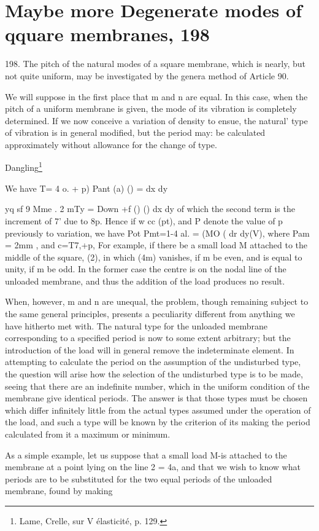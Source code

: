 \section{Maybe more Degenerate modes of qquare membranes, 198}

198. The pitch of the natural modes of a square membrane, which is
nearly, but not quite uniform, may be investigated by the genera method
of Article 90.

We will suppose in the first place that m and n are equal. In this case,
when the pitch of a uniform membrane is given, the mode of its vibration
is completely determined. If we now conceive a variation of density to
ensue, the natural' type of vibration is in general modified, but the
period may: be calculated approximately without allowance for the change
of type.

Dangling\footnote{ Lame, Crelle, sur V élasticité, p. 129.}

We have T= 4 o. + p) Pant (a) () = dx dy

yq sf 9 Mme . 2 mTy = Down +f () () dx dy of which the second term is
the increment of 7' due to 8p. Hence
if w cc (pt), and P denote the value of p previously to variation,
we have Pot Pmt=1-4 al. = (MO ( dr dy(V),
where Pam = 2mm , and c=T7,+p, For example, if there be a small load M
attached to the middle of the square,
(2),
in which (4m) vanishes, if m be even, and is equal to unity, if m be
odd. In the former case the centre is on the nodal line of the unloaded
membrane, and thus the addition of the load produces no result.

When, however, m and n are unequal, the problem, though remaining
subject to the same general principles, presents a peculiarity different
from anything we have hitherto met with. The natural type for the
unloaded membrane corresponding to a specified period is now to some
extent arbitrary; but the introduction of the load will in general
remove the indeterminate element. In attempting to calculate the period
on the assumption of the undisturbed type, the question will arise how
the selection of the undisturbed type is to be made, seeing that there
are an indefinite number, which in the uniform condition of the membrane
give identical periods. The answer is that those types must be chosen
which differ infinitely little from the actual types assumed under the
operation of the load, and such a type will be known by the criterion of
its making the period calculated from it a maximum or minimum.

As a simple example, let us suppose that a small load M-is attached to
the membrane at a point lying on the line 2 = 4a, and that we wish to
know what periods are to be substituted for the two equal periods of the
unloaded membrane, found by making

